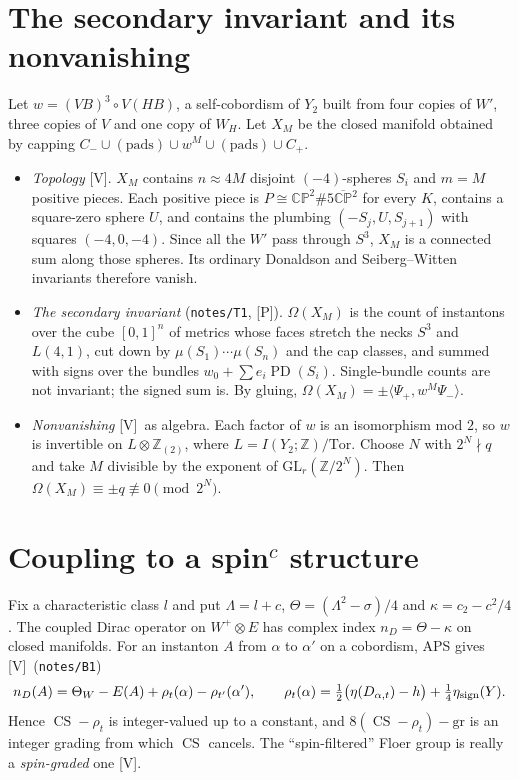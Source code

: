\documentclass[10pt]{amsart}
\theoremstyle{definition}\newtheorem{definition}[theorem]{Definition}\newtheorem{remark}[theorem]{Remark}
\newcommand{\Z}{\mathbb Z}\newcommand{\Q}{\mathbb Q}\newcommand{\F}{\mathbb F}
\newcommand{\CP}{\mathbb{CP}}\newcommand{\CPb}{\overline{\mathbb{CP}}{}^2}
\newcommand{\PD}{\operatorname{PD}}\newcommand{\CS}{\operatorname{CS}}
\newcommand{\V}{\textsf{[V]}}\newcommand{\Pl}{\textsf{[P]}}\newcommand{\Sp}{\textsf{[S]}}
\begin{document}
\section{The secondary invariant and its nonvanishing}
Let $w=(V B)^3\circ V(HB)$, a self-cobordism of $Y_2$ built from four copies of $W'$, three copies of $V$ and one copy of $W_H$. Let $X_M$ be the closed manifold obtained by capping $C_-\cup(\text{pads})\cup w^M\cup(\text{pads})\cup C_+$.
\begin{itemize}
\item \emph{Topology} \V. $X_M$ contains $n\approx4M$ disjoint $(-4)$-spheres $S_i$ and $m=M$ positive pieces. Each positive piece is $P\cong\CP^2\#5\CPb$ for every $K$, contains a square-zero sphere $U$, and contains the plumbing $(-S_j,U,S_{j+1})$ with squares $(-4,0,-4)$. Since all the $W'$ pass through $S^3$, $X_M$ is a connected sum along those spheres. Its ordinary Donaldson and Seiberg--Witten invariants therefore vanish.
\item \emph{The secondary invariant} (\texttt{notes/T1}, \Pl). $\Omega(X_M)$ is the count of instantons over the cube $[0,1]^n$ of metrics whose faces stretch the necks $S^3$ and $L(4,1)$, cut down by $\mu(S_1)\cdots\mu(S_n)$ and the cap classes, and summed with signs over the bundles $w_0+\sum e_i\PD(S_i)$. Single-bundle counts are not invariant; the signed sum is. By gluing, $\Omega(X_M)=\pm\langle\Psi_+,w^M\Psi_-\rangle$.
\item \emph{Nonvanishing} \V\ as algebra. Each factor of $w$ is an isomorphism mod $2$, so $w$ is invertible on $L\otimes\Z_{(2)}$, where $L=I(Y_2;\Z)/\mathrm{Tor}$. Choose $N$ with $2^N\nmid q$ and take $M$ divisible by the exponent of $\mathrm{GL}_r(\Z/2^N)$. Then $\Omega(X_M)\equiv\pm q\not\equiv0\pmod{2^N}$.
\end{itemize}

\section{Coupling to a spin$^c$ structure}
Fix a characteristic class $l$ and put $\Lambda=l+c$, $\Theta=(\Lambda^2-\sigma)/4$ and $\kappa=c_2-c^2/4$. The coupled Dirac operator on $W^+\otimes E$ has complex index $n_D=\Theta-\kappa$ on closed manifolds. For an instanton $A$ from $\alpha$ to $\alpha'$ on a cobordism, APS gives \V\ (\texttt{notes/B1})
\[
n_D(A)=\Theta_W-E(A)+\rho_t(\alpha)-\rho_{t'}(\alpha'),\qquad \rho_t(\alpha)=\tfrac12\big(\eta(D_{\alpha,t})-h\big)+\tfrac14\eta_{\rm sign}(Y).
\]
Hence $\CS-\rho_t$ is integer-valued up to a constant, and $8(\CS-\rho_t)-\mathrm{gr}$ is an integer grading from which $\CS$ cancels. The ``spin-filtered'' Floer group is really a \emph{spin-graded} one \V.
\end{document}
